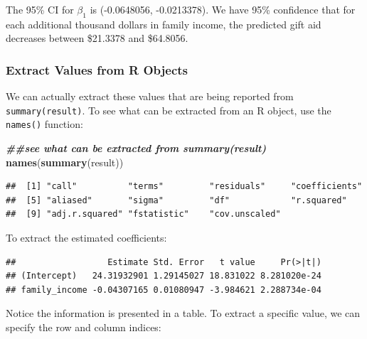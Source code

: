 \documentclass[
]{book}
\newenvironment{Shaded}{\begin{snugshade}}{\end{snugshade}}
\newcommand{\DecValTok}[1]{\textcolor[rgb]{0.00,0.00,0.81}{#1}}
\newcommand{\DocumentationTok}[1]{\textcolor[rgb]{0.56,0.35,0.01}{\textbf{\textit{#1}}}}
\newcommand{\FunctionTok}[1]{\textcolor[rgb]{0.13,0.29,0.53}{\textbf{#1}}}
\newcommand{\NormalTok}[1]{#1}
\newcommand{\SpecialCharTok}[1]{\textcolor[rgb]{0.81,0.36,0.00}{\textbf{#1}}}
\begin{document}
The 95\% CI for \(\beta_1\) is (-0.0648056, -0.0213378). We have 95\% confidence that for each additional thousand dollars in family income, the predicted gift aid decreases between \$21.3378 and \$64.8056.

\subsubsection*{Extract Values from R Objects}\label{extract-values-from-r-objects}

We can actually extract these values that are being reported from \texttt{summary(result)}. To see what can be extracted from an R object, use the \texttt{names()} function:

\begin{Shaded}
\begin{Highlighting}[]
\DocumentationTok{\#\#see what can be extracted from summary(result)}
\FunctionTok{names}\NormalTok{(}\FunctionTok{summary}\NormalTok{(result))}
\end{Highlighting}
\end{Shaded}

\begin{verbatim}
##  [1] "call"          "terms"         "residuals"     "coefficients" 
##  [5] "aliased"       "sigma"         "df"            "r.squared"    
##  [9] "adj.r.squared" "fstatistic"    "cov.unscaled"
\end{verbatim}

To extract the estimated coefficients:

\begin{Shaded}
\end{Shaded}

\begin{verbatim}
##                  Estimate Std. Error   t value     Pr(>|t|)
## (Intercept)   24.31932901 1.29145027 18.831022 8.281020e-24
## family_income -0.04307165 0.01080947 -3.984621 2.288734e-04
\end{verbatim}

Notice the information is presented in a table. To extract a specific value, we can specify the row and column indices:

\begin{Shaded}
\end{Shaded}
\end{document}
